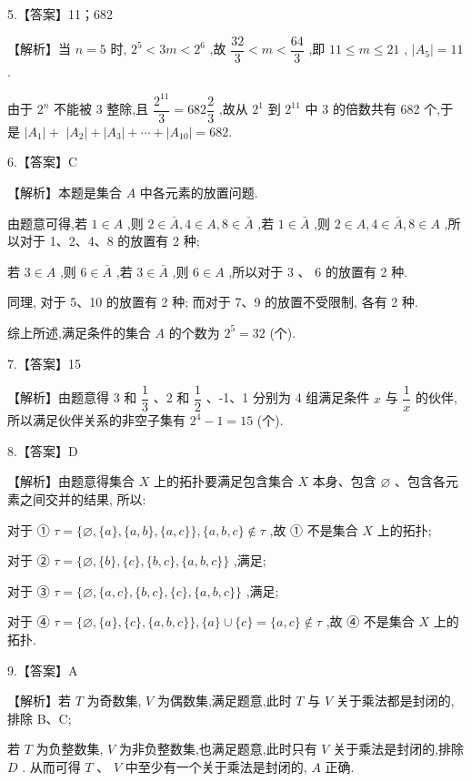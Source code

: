\documentclass[10pt]{article}
\begin{document}
5.【答案】11；682

【解析】当 $n = 5$ 时, ${2}^{5} < {3m} < {2}^{6}$ ,故 $\dfrac{32}{3} < m < \dfrac{64}{3}$ ,即 ${11} \leq  m \leq  {21}$ , $\left| {A}_{5}\right|  = {11}$ .

由于 ${2}^{n}$ 不能被 3 整除,且 $\dfrac{{2}^{11}}{3} = {682}\dfrac{2}{3}$ ,故从 ${2}^{1}$ 到 ${2}^{11}$ 中 3 的倍数共有 682 个,于是 $\left| {A}_{1}\right|  +$  $\left| {A}_{2}\right|  + \left| {A}_{3}\right|  + \cdots  + \left| {A}_{10}\right|  = {682}.$

6.【答案】C

【解析】本题是集合 $A$ 中各元素的放置问题.

由题意可得,若 $1 \in  A$ ,则 $2 \in  \bar{A},4 \in  A,8 \in  \bar{A}$ ,若 $1 \in  \bar{A}$ ,则 $2 \in  A,4 \in  \bar{A},8 \in  A$ ,所以对于 1、2、4、8 的放置有 2 种;

若 $3 \in  A$ ,则 $6 \in  \bar{A}$ ,若 $3 \in  \bar{A}$ ,则 $6 \in  A$ ,所以对于 $3\text{ 、 }6$ 的放置有 2 种.

同理, 对于 5、10 的放置有 2 种; 而对于 7、9 的放置不受限制, 各有 2 种.

综上所述,满足条件的集合 $A$ 的个数为 ${2}^{5} = {32}$ (个).

7.【答案】15

【解析】由题意得 3 和 $\dfrac{1}{3}$ 、2 和 $\dfrac{1}{2}$ 、-1、1 分别为 4 组满足条件 $x$ 与 $\dfrac{1}{x}$ 的伙伴,所以满足伙伴关系的非空子集有 ${2}^{4} - 1 = {15}$ (个).

8.【答案】D

【解析】由题意得集合 $X$ 上的拓扑要满足包含集合 $X$ 本身、包含 $\varnothing$ 、包含各元素之间交并的结果, 所以:

对于 ① $\tau  = \{ \varnothing ,\{ a\} ,\{ a,b\} ,\{ a,c\} \} ,\{ a,b,c\}  \notin  \tau$ ,故 ① 不是集合 $X$ 上的拓扑;

对于 ② $\tau  = \{ \varnothing ,\{ b\} ,\{ c\} ,\{ b,c\} ,\{ a,b,c\} \}$ ,满足;

对于 ③ $\tau  = \{ \varnothing ,\{ a,c\} ,\{ b,c\} ,\{ c\} ,\{ a,b,c\} \}$ ,满足;

对于 ④ $\tau  = \{ \varnothing ,\{ a\} ,\{ c\} ,\{ a,b,c\} \} ,\{ a\}  \cup  \{ c\}  = \{ a,c\}  \notin  \tau$ ,故 ④ 不是集合 $X$ 上的拓扑.

9.【答案】A

【解析】若 $T$ 为奇数集, $V$ 为偶数集,满足题意,此时 $T$ 与 $V$ 关于乘法都是封闭的,排除 B、C;

若 $T$ 为负整数集, $V$ 为非负整数集,也满足题意,此时只有 $V$ 关于乘法是封闭的,排除 ${D}$ . 从而可得 $T\text{ 、 }V$ 中至少有一个关于乘法是封闭的, ${A}$ 正确.
\end{document}
